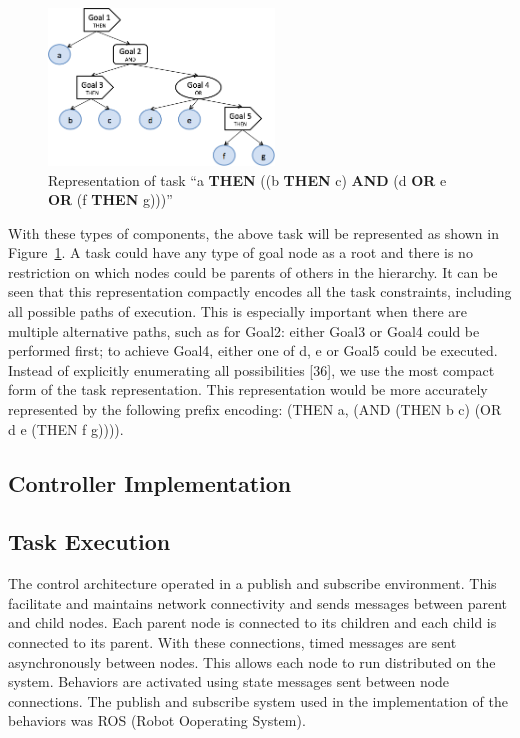 \documentclass[conference]{article}
\begin{document}
\begin{figure}
\centering
  \includegraphics[width=6cm]{task_img}
\caption{Representation of task ``a {\bf THEN} ((b {\bf THEN} c) {\bf AND} (d {\bf OR} e {\bf OR} (f {\bf THEN} g)))''}
\label{fig:task_representation}       %
\end{figure}
With these types of components, the above task will be represented as shown in Figure~\ref{fig:task_representation}. A task could have any type of goal node as a root and there is no restriction on which nodes could be parents of others in the hierarchy. It can be seen that this representation compactly encodes all the task constraints, including all possible paths of execution. This is especially important when there are multiple alternative paths, such as for Goal2: either Goal3 or Goal4 could be performed first; to achieve Goal4, either one of d, e or Goal5 could be executed. Instead of explicitly enumerating all possibilities [36], we use the most compact form of the task representation. This representation would be more accurately represented by the following prefix encoding: (THEN a, (AND (THEN b c) (OR d e (THEN f g)))).

\subsection{Controller Implementation}
\label{implementation}

\subsection{Task Execution}
\label{execution}
The control architecture operated in a publish and subscribe environment. This facilitate and maintains network connectivity and sends messages between parent and child nodes. Each parent node is connected to its children and each child is connected to its parent. With these connections, timed messages are sent asynchronously between nodes. This allows each node to run distributed on the system. Behaviors are activated using state messages sent between node connections. The publish and subscribe system used in the implementation of the behaviors was ROS (Robot Ooperating System).
\end{document}
